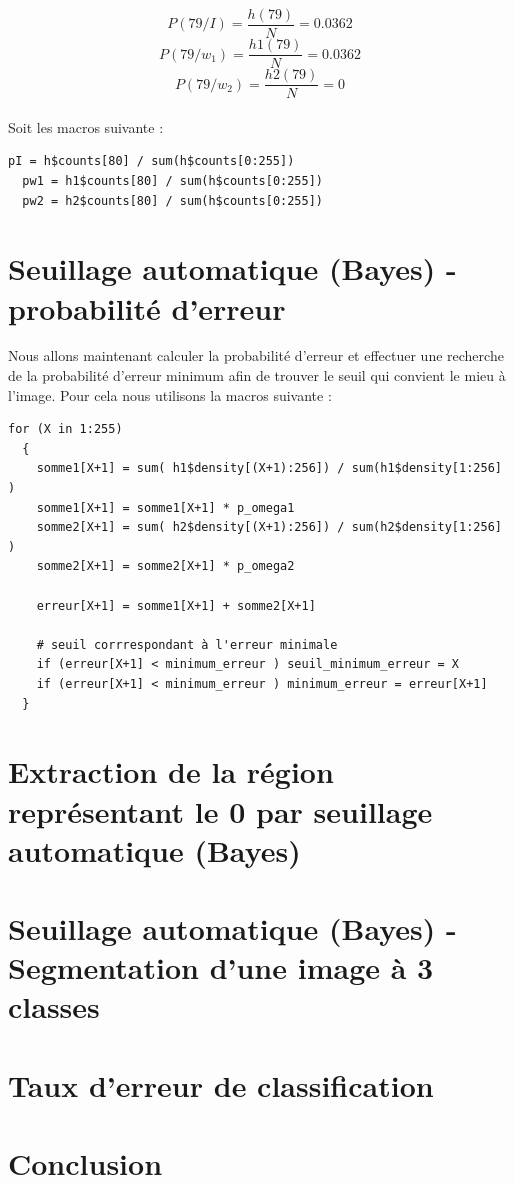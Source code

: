 \documentclass[a4paper,11pt]{article}
\begin{document}
  $$P(79/I) = \frac{h(79)}{N} = 0.0362$$
  $$P(79/w_1) = \frac{h1(79)}{N} = 0.0362$$
  $$P(79/w_2) = \frac{h2(79)}{N} = 0$$\\
  
  Soit les macros suivante : \\
  
  \begin{lstlisting}[caption=Macros de calcule de probabilité à priori des classe $N_{w_1}$ et $N_{w_2}$]
  pI = h$counts[80] / sum(h$counts[0:255])
  pw1 = h1$counts[80] / sum(h$counts[0:255])
  pw2 = h2$counts[80] / sum(h$counts[0:255])
  \end{lstlisting}
  
  \section{Seuillage automatique (Bayes) - probabilité d’erreur}
  Nous allons maintenant calculer la probabilité d'erreur et effectuer une recherche de la 
  probabilité d'erreur minimum afin de trouver le seuil qui convient le mieu à l'image.
  Pour cela nous utilisons la macros suivante :
  
  \begin{lstlisting}[caption=Macros de calcule de probabilité à priori des classe $N_{w_1}$ et $N_{w_2}$]
  for (X in 1:255) 
  { 
    somme1[X+1] = sum( h1$density[(X+1):256]) / sum(h1$density[1:256] )
    somme1[X+1] = somme1[X+1] * p_omega1  
    somme2[X+1] = sum( h2$density[(X+1):256]) / sum(h2$density[1:256] )
    somme2[X+1] = somme2[X+1] * p_omega2

    erreur[X+1] = somme1[X+1] + somme2[X+1]
    
    # seuil corrrespondant à l'erreur minimale
    if (erreur[X+1] < minimum_erreur ) seuil_minimum_erreur = X
    if (erreur[X+1] < minimum_erreur ) minimum_erreur = erreur[X+1]
  }
  \end{lstlisting}
  
  
  \section{Extraction de la région représentant le 0 par seuillage automatique (Bayes)}
  
  \section{Seuillage automatique (Bayes) - Segmentation d’une image à 3 classes}
  
  \section{Taux d’erreur de classification}
  
  \section*{Conclusion}
 
    
\end{document}
